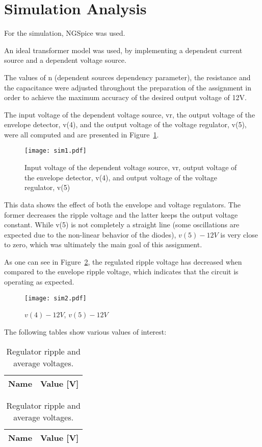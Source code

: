 \section{Simulation Analysis}
\label{sec:simulation}

For the simulation, NGSpice was used.

An ideal transformer model was used, by implementing a dependent current source and a dependent voltage source. 

The values of n (dependent sources dependency parameter), the resistance and the capacitance were adjusted throughout the preparation of the assignment in order to achieve the maximum accuracy of the desired output voltage of 12V.

The input voltage of the dependent voltage source, vr, the output voltage of the envelope detector, v(4), and the output voltage of the voltage regulator, v(5), were all computed and are presented in Figure~\ref{fig:sim3a}.


\begin{figure}[h] \centering
\texttt{[image: sim1.pdf]}
	\caption{Input voltage of the dependent voltage source, vr, output voltage of the envelope detector, v(4), and output voltage of the voltage regulator, v(5)}
\label{fig:sim3a}
\end{figure}


This data shows the effect of both the envelope and voltage regulators. The former decreases the ripple voltage and the latter keeps the output voltage constant. While v(5) is not completely a straight line (some oscillations are expected due to the non-linear behavior of the diodes), $v(5) - 12V$ is very close to zero, which was ultimately the main goal of this assignment. 

As one can see in Figure~\ref{fig:sim3b}, the regulated ripple voltage has decreased when compared to the envelope ripple voltage, which indicates that the circuit is operating as expected. 

\begin{figure}[h] \centering
\texttt{[image: sim2.pdf]}
	\caption{$v(4)-12V$, $v(5)-12V$}                        
\label{fig:sim3b} 
\end{figure}

The following tables show various values of interest:

\begin{table}[h]
        \parbox{.45\linewidth}{
  \centering
  \begin{tabular}{|l|r|}
    \hline
    {\bf Name} & {\bf Value [V]} \\ \hline
    
  \end{tabular}
  \caption{Envelope ripple and average voltages.}
	\label{tab:env}
}
\hfill
        \parbox{.45\linewidth}{
  \centering
  \begin{tabular}{|l|r|}
    \hline
    {\bf Name} & {\bf Value [V]} \\ \hline
    
  \end{tabular}
  \caption{Regulator ripple and average voltages.}
  \label{tab:reg}
}
\end{table}




